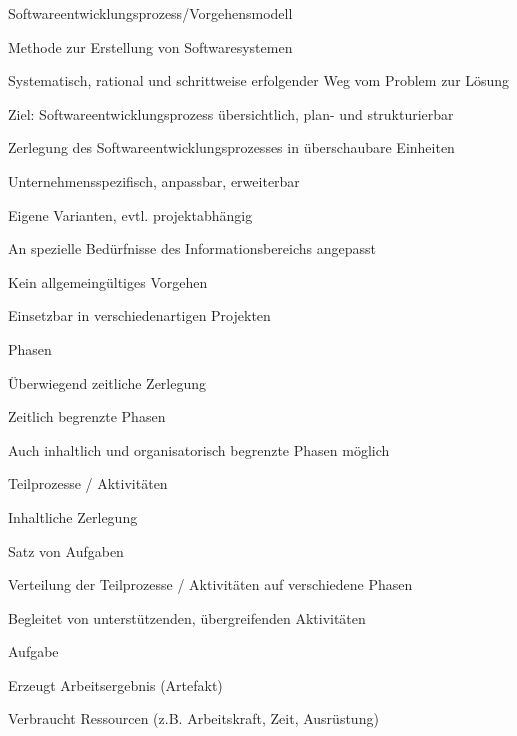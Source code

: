 \documentclass[a4paper]{article}
\begin{document}
\begin{multicols}{3}
  Softwareentwicklungsprozess/Vorgehensmodell
  \begin{itemize*}
    \item Methode zur Erstellung von Softwaresystemen
    \item Systematisch, rational und schrittweise erfolgender Weg vom Problem zur Lösung
    \item Ziel: Softwareentwicklungsprozess übersichtlich, plan- und strukturierbar
    \item Zerlegung des Softwareentwicklungsprozesses in überschaubare Einheiten
    \item Unternehmensspezifisch, anpassbar, erweiterbar
          \begin{itemize*}
            \item Eigene Varianten, evtl. projektabhängig
            \item An spezielle Bedürfnisse des Informationsbereichs angepasst
            \item Kein allgemeingültiges Vorgehen
            \item Einsetzbar in verschiedenartigen Projekten
          \end{itemize*}
  \end{itemize*}

  Phasen
  \begin{itemize*}
    \item Überwiegend zeitliche Zerlegung
    \item Zeitlich begrenzte Phasen
    \item Auch inhaltlich und organisatorisch begrenzte Phasen möglich
    \item Teilprozesse / Aktivitäten
          \begin{itemize*}
            \item Inhaltliche Zerlegung
            \item Satz von Aufgaben
            \item Verteilung der Teilprozesse / Aktivitäten auf verschiedene Phasen
            \item Begleitet von unterstützenden, übergreifenden Aktivitäten
          \end{itemize*}
  \end{itemize*}

  Aufgabe
  \begin{itemize*}
    \item Erzeugt Arbeitsergebnis (Artefakt)
    \item Verbraucht Ressourcen (z.B. Arbeitskraft, Zeit, Ausrüstung)
  \end{itemize*}


\end{multicols}
\end{document}
